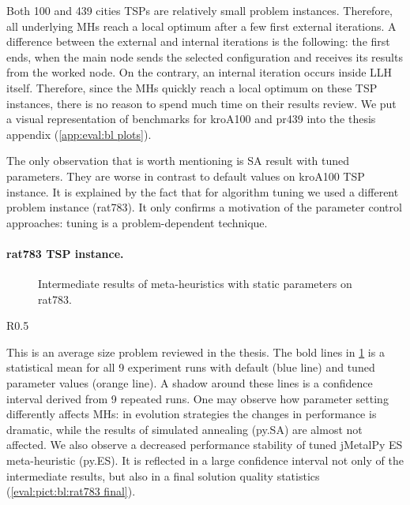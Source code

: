 Both 100 and 439 cities TSPs are relatively small problem instances. Therefore, all underlying MHs reach a local optimum after a few first external iterations. A difference between the external and internal iterations is the following: the first ends, when the main node sends the selected configuration and receives its results from the worked node. On the contrary, an internal iteration occurs inside LLH itself. Therefore, since the MHs quickly reach a local optimum on these TSP instances, there is no reason to spend much time on their results review. We put a visual representation of benchmarks for kroA100 and pr439 into the thesis appendix (\cref{app:eval:bl plots}).

The only observation that is worth mentioning is SA result with tuned parameters. They are worse in contrast to default values on kroA100 TSP instance. It is explained by the fact that for algorithm tuning we used a different problem instance (rat783). It only confirms a motivation of the parameter control approaches: tuning is a problem-dependent technique.

\paragraph{rat783 TSP instance.}
\begin{figure}[b]
	\centering
	\vspace{-20pt}
	
	\caption{Intermediate results of meta-heuristics with static parameters on rat783.}
	\vspace{-5pt}
	\label{eval:pict:bl:rat783 intermediate}
\end{figure}

\setlength{\columnsep}{5pt}%
\setlength{\intextsep}{5pt}%
\begin{wrapfigure}{R}{0.5\textwidth}%
	\centering
	
	\label{eval:pict:bl:rat783 final}
	\caption{Final results of meta-heuristics with static parameters on rat783.}
	\vspace{-10pt}
\end{wrapfigure}
This is an average size problem reviewed in the thesis. The bold lines in \cref{eval:pict:bl:rat783 intermediate} is a statistical mean for all 9 experiment runs with default (blue line) and tuned parameter values (orange line). A shadow around these lines is a confidence interval derived from 9 repeated runs. One may observe how parameter setting differently affects MHs: in evolution strategies the changes in performance is dramatic, while the results of simulated annealing (py.SA) are almost not affected. We also observe a decreased performance stability of tuned jMetalPy ES meta-heuristic (py.ES). It is reflected in a large confidence interval not only of the intermediate results, but also in a final solution quality statistics (\cref{eval:pict:bl:rat783 final}).

